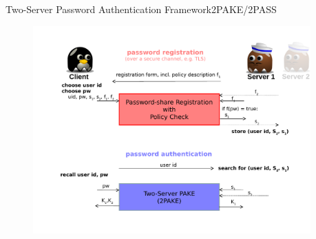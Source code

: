 \documentclass[notes,xcolor=dvipsnames]{beamer}
\begin{document}
\begin{frame}{Two-Server Password Authentication Framework}{2PAKE/2PASS}
  \begin{figure}
  \centering
  \includegraphics[width=0.95\textwidth]{framework2.pdf}
  \end{figure}
\end{frame}
\end{document}
